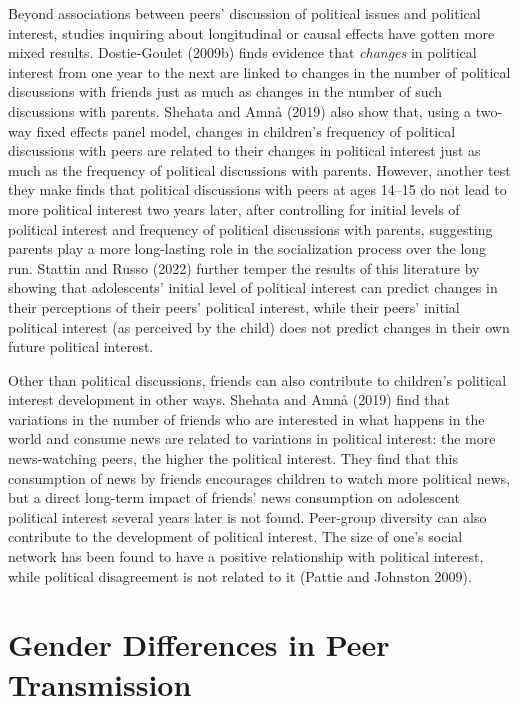 \documentclass[
  letterpaper,
  DIV=11,
  numbers=noendperiod]{scrreprt}
\begin{document}
Beyond associations between peers' discussion of political issues and
political interest, studies inquiring about longitudinal or causal
effects have gotten more mixed results. Dostie-Goulet (2009b) finds
evidence that \emph{changes} in political interest from one year to the
next are linked to changes in the number of political discussions with
friends just as much as changes in the number of such discussions with
parents. Shehata and Amnå (2019) also show that, using a two-way fixed
effects panel model, changes in children's frequency of political
discussions with peers are related to their changes in political
interest just as much as the frequency of political discussions with
parents. However, another test they make finds that political
discussions with peers at ages 14--15 do not lead to more political
interest two years later, after controlling for initial levels of
political interest and frequency of political discussions with parents,
suggesting parents play a more long-lasting role in the socialization
process over the long run. Stattin and Russo (2022) further temper the
results of this literature by showing that adolescents' initial level of
political interest can predict changes in their perceptions of their
peers' political interest, while their peers' initial political interest
(as perceived by the child) does not predict changes in their own future
political interest.

Other than political discussions, friends can also contribute to
children's political interest development in other ways. Shehata and
Amnå (2019) find that variations in the number of friends who are
interested in what happens in the world and consume news are related to
variations in political interest: the more news-watching peers, the
higher the political interest. They find that this consumption of news
by friends encourages children to watch more political news, but a
direct long-term impact of friends' news consumption on adolescent
political interest several years later is not found. Peer-group
diversity can also contribute to the development of political interest.
The size of one's social network has been found to have a positive
relationship with political interest, while political disagreement is
not related to it (Pattie and Johnston 2009).

\section{Gender Differences in Peer
Transmission}\label{gender-differences-in-peer-transmission}
\end{document}
